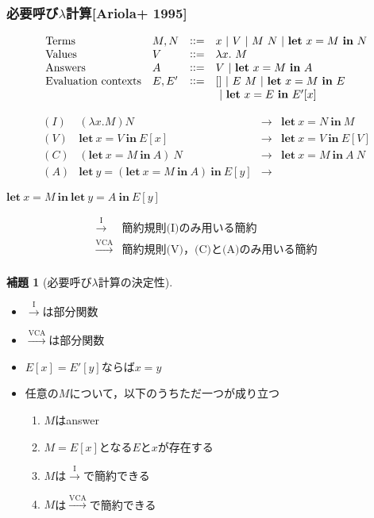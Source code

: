 \documentclass[dvipdfmx,cjk,xcolor=dvipsnames,envcountsect,notheorems,12pt]{beamer}
\theoremstyle{definition}
\newtheorem{lemma}{補題}
\newcommand{\LET}[3]{\mathbf{let}~#1=#2~\mathbf{in}~#3}
\newcommand{\CALLBYNEEDI}{\xrightarrow{\mathrm{I}}}
\newcommand{\CALLBYNEEDVCA}{\xrightarrow{\mathrm{VCA}}}
\begin{document}
\begin{frame}
	\frametitle{必要呼び$\lambda$計算[Ariola+ 1995]}
	{\normalsize
		\[\begin{array}{llcl}
			\mbox{Terms} & M,N & \vcentcolon\vcentcolon = & x~|~V~|~M~N~|~\LET{x}{M}{N} \\
			\mbox{Values} & V & \vcentcolon\vcentcolon = & \lambda x.~M \\
			\mbox{Answers} & A & \vcentcolon\vcentcolon = & V~|~\LET{x}{M}{A} \\
			\mbox{Evaluation contexts} & E,E' & \vcentcolon\vcentcolon = & [] ~|~ E~M ~|~\LET{x}{M}{E} \\
			& & & ~|~ \LET{x}{E}{E'[x]} \\
		\end{array}\] }
	{\normalsize
		\[ \begin{array}{lrcl}
			(I) & (\lambda x.M)N & \rightarrow & \LET{x}{N}{M} \\
			(V) & \LET{x}{V}{E[x]} & \rightarrow & \LET{x}{V}{E[V]} \\
			(C) & (\LET{x}{M}{A})~N & \rightarrow & \LET{x}{M}{A~N} \\
			(A) & \LET{y}{(\LET{x}{M}{A})}{E[y]} & \rightarrow &
		\end{array}\]
		\begin{flushright}
			$\LET{x}{M}{\LET{y}{A}{E[y]}}$
		\end{flushright}
		}
	{\normalsize
		\[ \begin{array}{ll}
			\CALLBYNEEDI & \mbox{簡約規則(I)のみ用いる簡約}\\
			\CALLBYNEEDVCA & \mbox{簡約規則(V)，(C)と(A)のみ用いる簡約}\\
		\end{array} \]}
\end{frame}

\begin{frame}
	\begin{lemma}[必要呼び$\lambda$計算の決定性]
	\begin{itemize}
		\item $\CALLBYNEEDI$は部分関数
		\item $\CALLBYNEEDVCA$は部分関数
		\item $E[x]=E'[y]$ならば$x=y$
		\item 任意の$M$について，以下のうちただ一つが成り立つ
			\begin{enumerate}
				\item $M$はanswer
				\item $M=E[x]$となる$E$と$x$が存在する
				\item $M$は$\CALLBYNEEDI$で簡約できる
				\item $M$は$\CALLBYNEEDVCA$で簡約できる
			\end{enumerate}
	\end{itemize}
	\end{lemma}
\end{frame}
\end{document}
